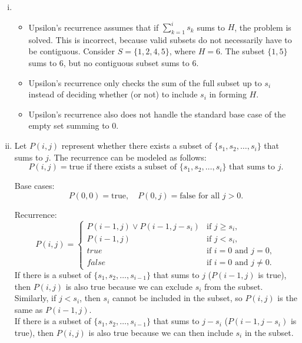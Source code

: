 \documentclass[11pt,addpoints,answers]{exam}
\begin{document}
\begin{questions}
\begin{parts}
  
  \pagebreak
  \begin{solution} 
    \begin{enumerate}[(i)]
      \item 
      \begin{itemize}
          \item Upsilon's recurrence assumes that if $\sum_{k=1}^i s_k$ sums to $H$, the problem is solved. This is incorrect, because valid subsets do not necessarily have to be contiguous. Consider $S = \{1, 2, 4, 5\}$, where $H = 6$. The subset $\{1, 5\}$ sums to $6$, but no contiguous subset sums to $6$.
          \item Upsilon's recurrence only checks the sum of the full subset up to $s_i$ instead of deciding whether (or not) to include $s_i$ in forming $H$.
          \item Upsilon's recurrence also does not handle the standard base case of the empty set summing to $0$.
      \end{itemize}
      \item
      Let $P(i, j)$ represent whether there exists a subset of $\{s_1, s_2, \dots, s_i\}$ that sums to $j$. The recurrence can be modeled as follows:
      \[
      P(i, j) = \text{true if there exists a subset of } \{s_1, s_2, \dots, s_i\} \text{ that sums to } j.
      \]
      
      Base cases:
      \[
      P(0, 0) = \text{true}, \quad P(0, j) = \text{false} \text{ for all } j > 0.
      \]
      
      Recurrence:
      \[
      P(i, j) =
      \begin{cases}
          P(i-1, j) \lor P(i-1, j - s_i) & \text{if } j \geq s_i, \\
          P(i-1, j) & \text{if } j < s_i,\\
          true & \text{if } i=0 \text{ and } j = 0,\\
          false & \text{if } i = 0 \text{ and } j \neq 0.
      \end{cases}
      \]
      If there is a subset of $\{s_1, s_2, \dots, s_{i-1}\}$ that sums to $j$ ($P(i-1, j)$ is true), then $P(i, j)$ is also true because we can exclude $s_i$ from the subset. Similarly, if $j < s_i$, then $s_i$ cannot be included in the subset, so $P(i, j)$ is the same as $P(i-1, j)$. \\
      If there is a subset of $\{s_1, s_2, \dots, s_{i-1}\}$ that sums to $j - s_i$ ($P(i-1, j - s_i)$ is true), then $P(i, j)$ is also true because we can then include $s_i$ in the subset.
    \end{enumerate}
  \end{solution}
  

\end{parts}
\end{questions}
\end{document}
